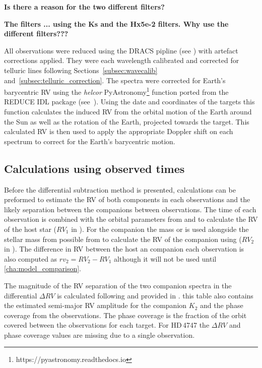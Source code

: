 \textbf{Is there a reason for the two different filters?}





\textbf{The filters ... using the {Ks} and the {Hx5e-2} filters. Why use the different filters???}

All observations were reduced using the DRACS pipline (see ) with artefact corrections applied.
They were each wavelength calibrated and corrected for telluric lines following Sections~\ref{subsec:wavecalib} and~\ref{subsec:telluric_correction}.
The spectra were corrected for Earth's barycentric {RV} using the \emph{helcor} PyAstronomy\footnote{https://pyastronomy.readthedocs.io} function ported from the REDUCE IDL package (see~\citet[][]{piskunov_new_2002}).
Using the date and coordinates of the targets this function calculates the induced RV from the orbital motion of the Earth around the Sun as well as the rotation of the Earth, projected towards the target.
This calculated RV is then used to apply the appropriate Doppler shift on each spectrum to correct for the Earth's barycentric motion.


\subsection{Calculations using observed times}
Before the differential subtraction method is presented, calculations can be preformed to estimate the RV of both components in each observations and the likely separation between the companions between observations.
The time of each observation is combined with the orbital parameters from  and \eref{} to calculate the RV of the host star (\({RV}_{1}\) in ).
For the companion the mass or \mtwosini  is used alongside the stellar mass from  possible from  to calculate the RV of the companion  using  (\({RV}_{2}\) in ).
The difference in RV between the host an companion each observation is also computed as \({rv}_{2} = {RV}_{2}-{RV}_{1}\) although it will not be used until \cref{cha:model_comparison}.

The magnitude of the RV separation of the two companion spectra in the differential \(\Delta RV\) is calculated following  and provided in . this table also contains the estimated semi-major RV amplitude for the companion \(K_2\) and the phase coverage from the observations. The phase coverage is the fraction of the orbit covered between the observations for each target. For {HD\,4747} the \(\Delta RV\) and phase coverage values are missing due to a single observation.

